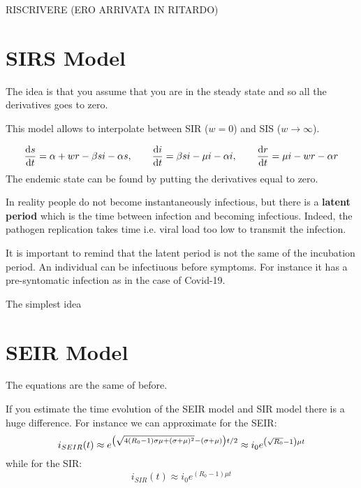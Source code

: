 \documentclass[../main/main.tex]{subfiles}
\begin{document}


RISCRIVERE (ERO ARRIVATA IN RITARDO)



\section{SIRS Model}

The idea is that you assume that you are in the steady state and so all the derivatives goes to zero.

This model allows to interpolate between SIR (\( w=0 \)) and SIS (\( w \rightarrow \infty  \)).

\begin{equation*}
  \dv{s}{t} = \alpha + w r - \beta  s i - \alpha s, \qquad \dv{i}{t} = \beta s i - \mu i - \alpha i, \qquad \dv{r}{t} = \mu i - w r - \alpha r
\end{equation*}
The endemic state can be found by putting the derivatives equal to zero.

In reality people do not become instantaneously infectious, but there is a \textbf{latent period} which is the time between infection and becoming infectious. Indeed, the pathogen replication takes time i.e. viral load too low to transmit the infection.

It is important to remind that the latent period is not the same of the incubation period. An individual can be infectiuous before symptoms. For instance it has a pre-syntomatic infection as in the case of Covid-19.

The simplest idea

\section{SEIR Model}
The equations are the same of before.

If you estimate the time evolution of the SEIR model and SIR model there is a huge difference. For instance we can approximate for the SEIR:
\begin{equation*}
  i_{SEIR} (t) \approx e^{\qty(\sqrt{4(R_0-1)\sigma \mu  + (\sigma + \mu )^2} -(\sigma +\mu ))t/2 } \approx i_0 e^{\qty(\sqrt{R_0} -1 ) \mu t}
\end{equation*}
while for the SIR:
\begin{equation*}
  i_{SIR} (t) \approx i_0 e^{(R_0-1) \mu t}
\end{equation*}
\end{document}
